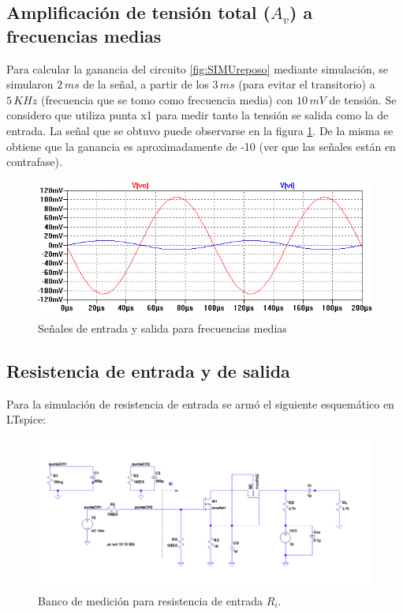 \documentclass[10pt,spanish,a4paper,notitlepage]{article}
\begin{document}
\subsection{Amplificación de tensión total (\texorpdfstring{$A_v$}{TEXT}) a frecuencias medias}

Para calcular la ganancia del circuito \ref{fig:SIMUreposo}  mediante simulación, se
simularon $2\,\unit{ms}$ de la señal, a partir de los $3\,\unit{ms}$ (para evitar el
transitorio) a $5\,\unit{KHz}$ (frecuencia que se tomo como frecuencia media) con
$10\,\unit{mV}$ de tensión. Se considero que utiliza punta x1 para medir tanto la
tensión se salida como la de entrada. La señal que se obtuvo puede observarse en la
figura \ref{fig:SIMUAvmedias}. De la misma se obtiene que la ganancia es
aproximadamente de -10 (ver que las señales están en contrafase).


\begin{figure}[H]
\centering
\includegraphics[scale=0.8]{senales/Avmedias.png}
\caption{Señales de entrada y salida para frecuencias medias}
\label{fig:SIMUAvmedias}
\end{figure}

\subsection{Resistencia de entrada y de salida}

Para la simulación de resistencia de entrada se armó el siguiente esquemático en LTspice:

\begin{figure}[H]
\centering
\includegraphics[scale=0.45]{circuitos/Esquematico-sim-Ri-con-punta.png}
\caption{Banco de medición para resistencia de entrada $R_{i}$.}
\label{fig:Ritotal}
\end{figure}
\end{document}
